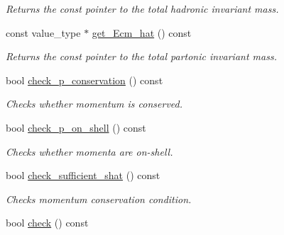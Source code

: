 \begin{DoxyCompactItemize}
\begin{DoxyCompactList}\small\item\em Returns the const pointer to the total hadronic invariant mass. \end{DoxyCompactList}\item 
\hypertarget{a00450_a98ef07838819ee024376ca18407c94e7}{}const value\+\_\+type $\ast$ \hyperlink{a00450_a98ef07838819ee024376ca18407c94e7}{get\+\_\+\+Ecm\+\_\+hat} () const \label{a00450_a98ef07838819ee024376ca18407c94e7}

\begin{DoxyCompactList}\small\item\em Returns the const pointer to the total partonic invariant mass. \end{DoxyCompactList}\item 
\hypertarget{a00450_ad9b77d74cfcac649bcfeb21e20cfd3a6}{}bool \hyperlink{a00450_ad9b77d74cfcac649bcfeb21e20cfd3a6}{check\+\_\+p\+\_\+conservation} () const \label{a00450_ad9b77d74cfcac649bcfeb21e20cfd3a6}

\begin{DoxyCompactList}\small\item\em Checks whether momentum is conserved. \end{DoxyCompactList}\item 
\hypertarget{a00450_a369ca024b5d8ca76944c637750fff5ee}{}bool \hyperlink{a00450_a369ca024b5d8ca76944c637750fff5ee}{check\+\_\+p\+\_\+on\+\_\+shell} () const \label{a00450_a369ca024b5d8ca76944c637750fff5ee}

\begin{DoxyCompactList}\small\item\em Checks whether momenta are on-\/shell. \end{DoxyCompactList}\item 
\hypertarget{a00450_ad8133aa09462264115d74513231c3360}{}bool \hyperlink{a00450_ad8133aa09462264115d74513231c3360}{check\+\_\+sufficient\+\_\+shat} () const \label{a00450_ad8133aa09462264115d74513231c3360}

\begin{DoxyCompactList}\small\item\em Checks momentum conservation condition. \end{DoxyCompactList}\item 
\hypertarget{a00450_a5f12a5f451e7abb67dbf320df444b458}{}bool \hyperlink{a00450_a5f12a5f451e7abb67dbf320df444b458}{check} () const \label{a00450_a5f12a5f451e7abb67dbf320df444b458}


\end{DoxyCompactItemize}
